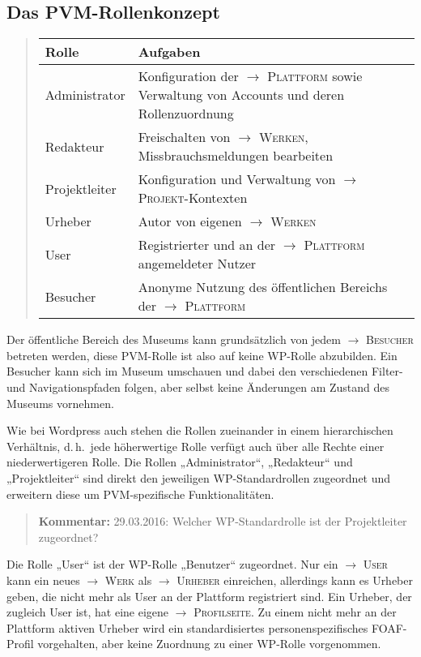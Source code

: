 \documentclass[a4paper,11pt]{article}
\newcommand{\Kommentar}[1]{
  \begin{quote}\textbf{Kommentar:} #1 \end{quote}
}
\newcommand{\glossar}[1]{{$\to$ \textsc{#1}}}
\begin{document}
\subsection{Das PVM-Rollenkonzept}\label{grundlagen.rollenkonzept}
\begin{quote}
  \begin{tabular}{l|p{}}
    \textbf{Rolle} & \textbf{Aufgaben}\\\hline
    Administrator & Konfiguration der \glossar{Plattform} sowie Verwaltung von
    Accounts und deren Rollenzuordnung\\ 
    Redakteur & Freischalten von \glossar{Werken}, Missbrauchsmeldungen
    bearbeiten\\ 
    Projektleiter & Konfiguration und Verwaltung von
    \glossar{Projekt}-Kontexten\\ 
    Urheber & Autor von eigenen \glossar{Werken}\\
    User & Registrierter und an der \glossar{Plattform} angemeldeter Nutzer\\
    Besucher & Anonyme Nutzung des öffentlichen Bereichs der
    \glossar{Plattform} 
  \end{tabular}
\end{quote}
Der öffentliche Bereich des Museums kann grundsätzlich von jedem
\glossar{Besucher} betreten werden, diese PVM-Rolle ist also auf keine WP-Rolle
abzubilden. Ein Besucher kann sich im Museum umschauen und dabei den
verschiedenen Filter- und Navigationspfaden folgen, aber selbst keine
Änderungen am Zustand des Museums vornehmen. 

Wie bei Wordpress auch stehen die Rollen zueinander in einem hierarchischen
Verhältnis, d.\,h.\ jede höherwertige Rolle verfügt auch über alle Rechte einer
niederwertigeren Rolle.  Die Rollen „Administrator“, „Redakteur“ und
„Projektleiter“ sind direkt den jeweiligen WP-Standardrollen zugeordnet und
erweitern diese um PVM-spezifische Funktionalitäten.  

\Kommentar{29.03.2016: Welcher WP-Standardrolle ist der Projektleiter
  zugeordnet? }

Die Rolle „User“ ist der WP-Rolle „Benutzer“ zugeordnet. Nur ein
\glossar{User} kann ein neues \glossar{Werk} als \glossar{Urheber} einreichen,
allerdings kann es Urheber geben, die nicht mehr als User an der Plattform
registriert sind.  Ein Urheber, der zugleich User ist, hat eine eigene
\glossar{Profilseite}. Zu einem nicht mehr an der Plattform aktiven Urheber
wird ein standardisiertes personenspezifisches FOAF-Profil vorgehalten, aber
keine Zuordnung zu einer WP-Rolle vorgenommen.
\end{document}
